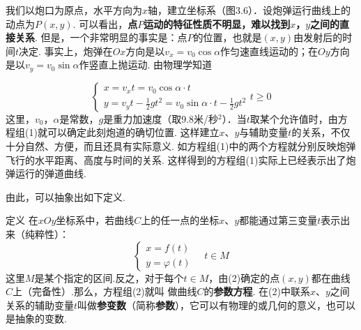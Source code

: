 \noindent
\begin{minipage}{.55\textwidth}\CTEXindent
我们以炮口为原点，水平方向为$x$轴，建立坐标系（图3.6）．设炮弹运行曲线上的动点为$P(x,y)$. 可以看出，\textbf{点$P$运动的特征性质不明显，难以找到$x$，$y$之间的直接关系}. 但是，一个非常明显的事实是：点$P$的位置，也就是$(x,y)$由发射后的时
间$t$决定. 事实上，炮弹在$Ox$方向是以$v_x=v_0\cos\alpha$作匀速直线运动的；在$Oy$方向是以$v_y=v_0\sin\alpha$作竖直上抛运动. 由物理学知道
\end{minipage}
\hfill
\begin{minipage}{.43\textwidth}
\centering
{}
\end{minipage}

\begin{equation}
\begin{cases}
    x=v_x t=v_0\cos\alpha \cdot t\\
    y=v_y t-\frac{1}{2}gt^2= v_0\sin\alpha\cdot t-\frac{1}{2}gt^2
\end{cases} t\ge 0  \tag{1}
\end{equation}
这里，$v_0$，$\alpha$是常数，$g$是重力加速度（取9.8米/秒$^2$）．当$t$取某个允许值时，由方程组(1)就可以确定此刻炮道的确切位置. 这样建立$x$、$y$与辅助变量$t$的关系，不仅十分自然、方便，而且还具有实际意义. 如方程组(1)中的两个方程就分别反映炮弹飞行的水平距离、高度与时间的关系. 这样得到的方程组(1)实际上已经表示出了炮弹运行的弹道曲线.

由此，可以抽象出如下定义.

\begin{thm}
{定义} 在$xOy$坐标系中，若曲线$C$上的任一点的坐标$x$、$y$都能通过第三变量$t$表示出来（纯粹性）：
\begin{equation}
    \begin{cases}
        x=f(t)\\y=\varphi(t) 
    \end{cases}\quad t\in M \tag{2}
\end{equation}
这里$M$是某个指定的区间.反之，对于每个$t\in M$，由(2)确定的点$(x,y)$都在曲线$C$上（完备性）.那么，方程组(2)就叫
做曲线$C$的\textbf{参数方程}. 在(2)中联系$x$、$y$之间关系的辅助变量$t$叫做\textbf{参变数}（简称\textbf{参数}），它可以有物理的或几何的意义，也可以是抽象的变数.
\end{thm}

